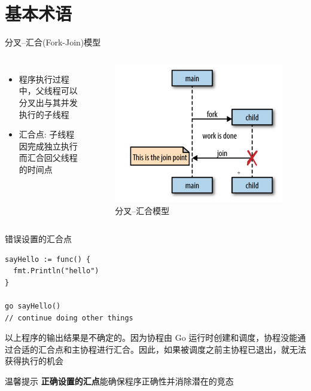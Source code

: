 \section{基本术语}
\begin{frame}{分叉--汇合(Fork-Join)模型}
  \begin{columns}
        \begin{itemize}
          \item 程序执行过程中，\alert{父线程}可以分叉出与其并发执行的\alert{子线程}
          \item \alert{汇合点}: 子线程因完成独立执行而汇合回父线程的时间点
        \end{itemize}

      \begin{figure}
        \includegraphics[width=\textwidth]{images/fork-join.png}
        \caption{分叉--汇合模型}
      \end{figure}
  \end{columns}
\end{frame}

\begin{frame}[fragile]{错误设置的汇合点}
\begin{lstlisting}[caption={不正确的汇合点引发竞态},label={wrong-join}]
sayHello := func() {
  fmt.Println("hello")
}

go sayHello()
// continue doing other things
\end{lstlisting}

  \pause
  \alert{以上程序的输出结果是不确定的}。因为协程由 Go 运行时创建和调度，协程没能通过合适的汇合点和主协程进行汇合。因此，如果被调度之前主协程已退出，就无法获得执行的机会

  \pause
  \begin{exampleblock}{温馨提示}
      \textbf{正确设置的汇点}能确保程序正确性并消除潜在的\alert{竞态} 
  \end{exampleblock}
\end{frame}

